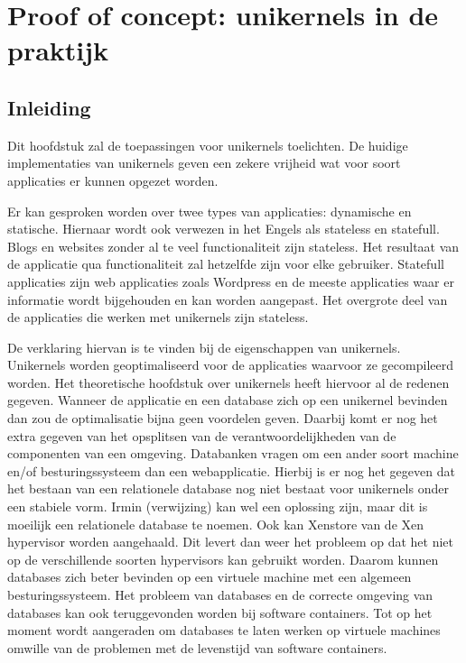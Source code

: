 \chapter{Proof of concept: unikernels in de praktijk}
\section{Inleiding}

Dit hoofdstuk zal de toepassingen voor unikernels toelichten. De huidige implementaties van unikernels geven een zekere vrijheid wat voor soort applicaties er kunnen opgezet worden.  

Er kan gesproken worden over twee types van applicaties: dynamische en statische. Hiernaar wordt ook verwezen in het Engels als stateless en statefull. Blogs en websites zonder al te veel functionaliteit zijn stateless. Het resultaat van de applicatie qua functionaliteit zal hetzelfde zijn voor elke gebruiker. Statefull applicaties zijn web applicaties zoals Wordpress en de meeste applicaties waar er informatie wordt bijgehouden en kan worden aangepast. Het overgrote deel van de applicaties die werken met unikernels zijn stateless.

De verklaring hiervan is te vinden bij de eigenschappen van unikernels. Unikernels worden geoptimaliseerd voor de applicaties waarvoor ze gecompileerd worden. Het theoretische hoofdstuk over unikernels heeft hiervoor al de redenen gegeven. Wanneer de applicatie en een database zich op een unikernel bevinden dan zou de optimalisatie bijna geen voordelen geven. Daarbij komt er nog het extra gegeven van het opsplitsen van de verantwoordelijkheden van de componenten van een omgeving. Databanken vragen om een ander soort machine en/of besturingssysteem dan een webapplicatie. Hierbij is er nog het gegeven dat het bestaan van een relationele database nog niet bestaat voor unikernels onder een stabiele vorm. Irmin (verwijzing) kan wel een oplossing zijn, maar dit is moeilijk een relationele database te noemen. Ook kan Xenstore van de Xen hypervisor worden aangehaald. Dit levert dan weer het probleem op dat het niet op de verschillende soorten hypervisors kan gebruikt worden. Daarom kunnen databases zich beter bevinden op een virtuele machine met een algemeen besturingssysteem. Het probleem van databases en de correcte omgeving van databases kan ook teruggevonden worden bij software containers. Tot op het moment wordt aangeraden om databases te laten werken op virtuele machines omwille van de problemen met de levenstijd van software containers.

